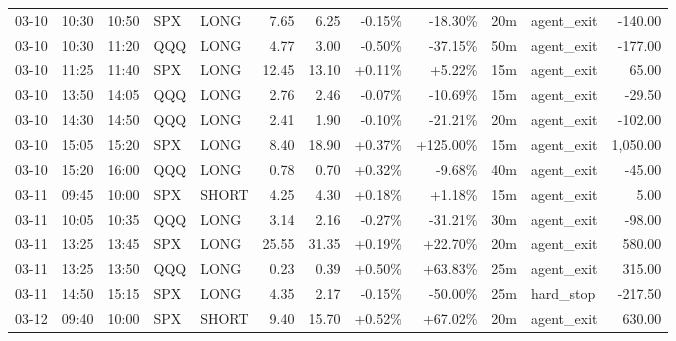\documentclass[11pt,a4paper]{article}
\begin{document}
\begin{center}
\begin{longtable}{>{\color{txtmain}}l l l l l r r r r r >{\color{txtmain}}l r}
03-10 & 10:30 & 10:50 & SPX & LONG & 7.65 & 6.25 & \textcolor{lossred}{-0.15\%} & \textcolor{lossred}{-18.30\%} & 20m & agent\_exit & \textcolor{lossred}{-140.00} \\
03-10 & 10:30 & 11:20 & QQQ & LONG & 4.77 & 3.00 & \textcolor{lossred}{-0.50\%} & \textcolor{lossred}{-37.15\%} & 50m & agent\_exit & \textcolor{lossred}{-177.00} \\
03-10 & 11:25 & 11:40 & SPX & LONG & 12.45 & 13.10 & \textcolor{wingreen}{+0.11\%} & \textcolor{wingreen}{+5.22\%} & 15m & agent\_exit & \textcolor{wingreen}{65.00} \\
03-10 & 13:50 & 14:05 & QQQ & LONG & 2.76 & 2.46 & \textcolor{lossred}{-0.07\%} & \textcolor{lossred}{-10.69\%} & 15m & agent\_exit & \textcolor{lossred}{-29.50} \\
03-10 & 14:30 & 14:50 & QQQ & LONG & 2.41 & 1.90 & \textcolor{lossred}{-0.10\%} & \textcolor{lossred}{-21.21\%} & 20m & agent\_exit & \textcolor{lossred}{-102.00} \\
03-10 & 15:05 & 15:20 & SPX & LONG & 8.40 & 18.90 & \textcolor{wingreen}{+0.37\%} & \textcolor{wingreen}{+125.00\%} & 15m & agent\_exit & \textcolor{wingreen}{1,050.00} \\
03-10 & 15:20 & 16:00 & QQQ & LONG & 0.78 & 0.70 & \textcolor{wingreen}{+0.32\%} & \textcolor{lossred}{-9.68\%} & 40m & agent\_exit & \textcolor{lossred}{-45.00} \\
03-11 & 09:45 & 10:00 & SPX & SHORT & 4.25 & 4.30 & \textcolor{wingreen}{+0.18\%} & \textcolor{wingreen}{+1.18\%} & 15m & agent\_exit & \textcolor{wingreen}{5.00} \\
03-11 & 10:05 & 10:35 & QQQ & LONG & 3.14 & 2.16 & \textcolor{lossred}{-0.27\%} & \textcolor{lossred}{-31.21\%} & 30m & agent\_exit & \textcolor{lossred}{-98.00} \\
03-11 & 13:25 & 13:45 & SPX & LONG & 25.55 & 31.35 & \textcolor{wingreen}{+0.19\%} & \textcolor{wingreen}{+22.70\%} & 20m & agent\_exit & \textcolor{wingreen}{580.00} \\
03-11 & 13:25 & 13:50 & QQQ & LONG & 0.23 & 0.39 & \textcolor{wingreen}{+0.50\%} & \textcolor{wingreen}{+63.83\%} & 25m & agent\_exit & \textcolor{wingreen}{315.00} \\
03-11 & 14:50 & 15:15 & SPX & LONG & 4.35 & 2.17 & \textcolor{lossred}{-0.15\%} & \textcolor{lossred}{-50.00\%} & 25m & hard\_stop & \textcolor{lossred}{-217.50} \\
03-12 & 09:40 & 10:00 & SPX & SHORT & 9.40 & 15.70 & \textcolor{wingreen}{+0.52\%} & \textcolor{wingreen}{+67.02\%} & 20m & agent\_exit & \textcolor{wingreen}{630.00} \\

\end{longtable}
\end{center}
\end{document}
